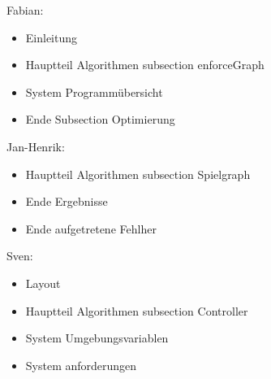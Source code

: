 Fabian:
\begin{itemize}
	\item Einleitung
	\item Hauptteil Algorithmen subsection enforceGraph
	\item System Programmübersicht 
	\item Ende Subsection Optimierung
\end{itemize}
Jan-Henrik:
\begin{itemize}
	\item Hauptteil Algorithmen subsection Spielgraph
	\item Ende Ergebnisse
	\item Ende aufgetretene Fehlher
\end{itemize}
Sven:
\begin{itemize}
	\item Layout
	\item Hauptteil Algorithmen subsection Controller
	\item System Umgebungsvariablen
	\item System anforderungen
\end{itemize}
